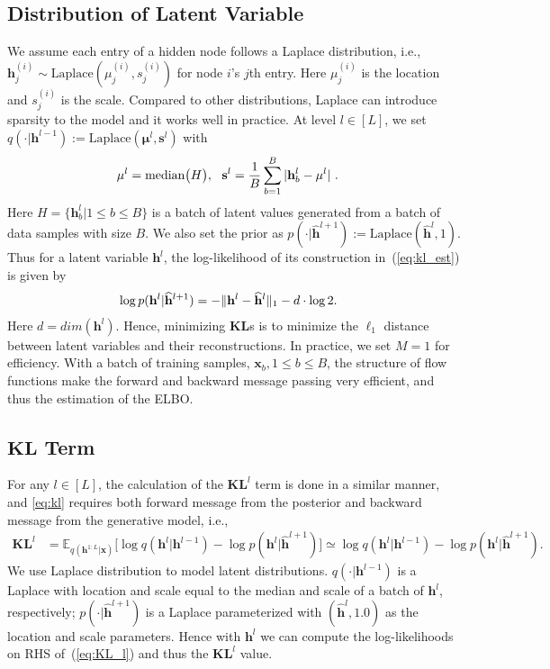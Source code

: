 \documentclass{article}
\begin{document}
\subsection{Distribution of Latent Variable}
 We assume each entry of a hidden node follows a Laplace distribution, i.e., $\mathbf{h}_j^{(i)} \sim \text{Laplace}(\mu_j^{(i)}, s_j^{(i)})$ for node $i$'s $j$th entry. Here $\mu_j^{(i)}$ is the location and $s_j^{(i)}$ is the scale. Compared to other distributions, Laplace can introduce sparsity to the model and it works well in practice. At level $l \in [L]$, we set $q(\cdot|\mathbf{h}^{l-1}) := \text{Laplace}(\mathbf{\mu}^l, \mathbf{s}^l)$ with
\begin{align} \notag
&\mathbf{\mu}^l = \text{median}\big(H\big), \ \  \mathbf{s}^l =\frac{1}{B}\sum_{b=1}^B|\mathbf{h}_b^l - \mathbf{\mu}^l| \ .
\end{align}
Here $H=\{\mathbf{h}^l_b| 1\leqslant b \leqslant B\}$ is a batch of latent values generated from a batch of data samples with size $B$. 
We also set the prior as $p(\cdot | \widehat{\mathbf{h}}^{l+1}):=\text{Laplace}(\widehat{\mathbf{h}}^l, 1)$. Thus for a latent variable $\mathbf{h}^l$, the log-likelihood of its construction in~(\ref{eq:kl_est}) is given by 
\begin{align} \notag
& \log p(\mathbf{h}^l | \widehat{\mathbf{h}}^{l+1}) = -\|\mathbf{h}^l- \widehat{\mathbf{h}}^l\|_1 -d\cdot\log2  .
\end{align}
Here $d = dim(\mathbf{h}^l)$. Hence, minimizing  $\mathbf{KL}$s is to minimize the $\ell_1$ distance between latent variables and their reconstructions. In practice, we set $M=1$ for efficiency. With a batch of training samples, $\mathbf{x}_b, 1 \leqslant b \leqslant B$, the structure of flow functions make the  forward  and  backward message passing very efficient, and  thus the estimation of the ELBO.  

\subsection{$\mathbf{KL}$ Term}
For any $l \in [L]$, the calculation of the $\mathbf{KL}^l$ term is done in a similar manner, and  \eqref{eq:kl} requires  both  forward message  from  the posterior and backward message from the generative model, i.e.,
\begin{align}\label{eq:KL_l}
\mathbf{KL}^l&=\mathbb{E}_{q(\mathbf{h}^{1:L}|\mathbf{x})}\big[  \log q(\mathbf{h}^{l}|\mathbf{h}^{l-1})   - \log p(\mathbf{h}^{l}|\widehat{\mathbf{h}}^{l+1}) \big] \simeq  \log q(\mathbf{h}^{l}|\mathbf{h}^{l-1})   - \log p(\mathbf{h}^{l}|\widehat{\mathbf{h}}^{l+1}).
\end{align} 
We use Laplace distribution to model latent distributions. $q(\cdot|\mathbf{h}^{l-1})$ is a Laplace with location and scale equal to the median and scale of a batch of $\mathbf{h}^{l}$, respectively; $p(\cdot|\widehat{\mathbf{h}}^{l+1})$ is a  Laplace parameterized  with  $(\widehat{\mathbf{h}}^{l}, 1.0)$ as the location and scale parameters. Hence with $\mathbf{h}^{l}$ we can compute the log-likelihoods on RHS of~(\ref{eq:KL_l}) and thus the $\mathbf{KL}^l$ value.
\end{document}
